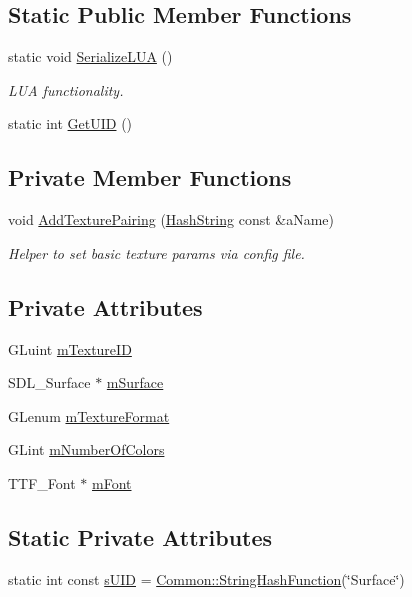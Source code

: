 \subsection*{Static Public Member Functions}
\begin{DoxyCompactItemize}
\item 
static void \hyperlink{classPCSurface_a6ac5954feec5e95494c23f91d15cb2dc}{Serialize\+L\+UA} ()
\begin{DoxyCompactList}\small\item\em L\+UA functionality. \end{DoxyCompactList}\item 
static int \hyperlink{classPCSurface_acc7b297103fb791aca8598c021db6d14}{Get\+U\+ID} ()
\end{DoxyCompactItemize}
\subsection*{Private Member Functions}
\begin{DoxyCompactItemize}
\item 
void \hyperlink{classPCSurface_a2c8615d1b29b75dba4617e888ca2bfc2}{Add\+Texture\+Pairing} (\hyperlink{classHashString}{Hash\+String} const \&a\+Name)
\begin{DoxyCompactList}\small\item\em Helper to set basic texture params via config file. \end{DoxyCompactList}\end{DoxyCompactItemize}
\subsection*{Private Attributes}
\begin{DoxyCompactItemize}
\item 
G\+Luint \hyperlink{classPCSurface_aabc8986049dd19fee4fc8925d140ab9a}{m\+Texture\+ID}
\item 
S\+D\+L\+\_\+\+Surface $\ast$ \hyperlink{classPCSurface_a7f07033400779e51dff4205be13605eb}{m\+Surface}
\item 
G\+Lenum \hyperlink{classPCSurface_ae908fec720f181dd41b7beda56feb2b3}{m\+Texture\+Format}
\item 
G\+Lint \hyperlink{classPCSurface_ac304930d496687ba20bac20358153ff6}{m\+Number\+Of\+Colors}
\item 
T\+T\+F\+\_\+\+Font $\ast$ \hyperlink{classPCSurface_a805c3914db0f5ee9861fb521456f6aa3}{m\+Font}
\end{DoxyCompactItemize}
\subsection*{Static Private Attributes}
\begin{DoxyCompactItemize}
\item 
static int const \hyperlink{classPCSurface_a865bdb0c656fe7247527f184a02239d8}{s\+U\+ID} = \hyperlink{namespaceCommon_a994c43a8ea7b03968186a635687a6521}{Common\+::\+String\+Hash\+Function}(\char`\"{}Surface\char`\"{})
\end{DoxyCompactItemize}
